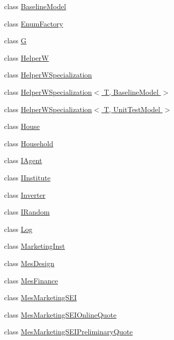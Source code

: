 \begin{DoxyCompactItemize}
\item 
class \hyperlink{classsolar__core_1_1_baseline_model}{Baseline\+Model}
\item 
class \hyperlink{classsolar__core_1_1_enum_factory}{Enum\+Factory}
\item 
class \hyperlink{classsolar__core_1_1_g}{G}
\item 
class \hyperlink{classsolar__core_1_1_helper_w}{Helper\+W}
\item 
class \hyperlink{classsolar__core_1_1_helper_w_specialization}{Helper\+W\+Specialization}
\item 
class \hyperlink{classsolar__core_1_1_helper_w_specialization_3_01_t_00_01_baseline_model_01_4}{Helper\+W\+Specialization$<$ T, Baseline\+Model $>$}
\item 
class \hyperlink{classsolar__core_1_1_helper_w_specialization_3_01_t_00_01_unit_test_model_01_4}{Helper\+W\+Specialization$<$ T, Unit\+Test\+Model $>$}
\item 
class \hyperlink{classsolar__core_1_1_house}{House}
\item 
class \hyperlink{classsolar__core_1_1_household}{Household}
\item 
class \hyperlink{classsolar__core_1_1_i_agent}{I\+Agent}
\item 
class \hyperlink{classsolar__core_1_1_i_institute}{I\+Institute}
\item 
class \hyperlink{classsolar__core_1_1_inverter}{Inverter}
\item 
class \hyperlink{classsolar__core_1_1_i_random}{I\+Random}
\item 
class \hyperlink{classsolar__core_1_1_log}{Log}
\item 
class \hyperlink{classsolar__core_1_1_marketing_inst}{Marketing\+Inst}
\item 
class \hyperlink{classsolar__core_1_1_mes_design}{Mes\+Design}
\item 
class \hyperlink{classsolar__core_1_1_mes_finance}{Mes\+Finance}
\item 
class \hyperlink{classsolar__core_1_1_mes_marketing_s_e_i}{Mes\+Marketing\+S\+E\+I}
\item 
class \hyperlink{classsolar__core_1_1_mes_marketing_s_e_i_online_quote}{Mes\+Marketing\+S\+E\+I\+Online\+Quote}
\item 
class \hyperlink{classsolar__core_1_1_mes_marketing_s_e_i_preliminary_quote}{Mes\+Marketing\+S\+E\+I\+Preliminary\+Quote}
\item 

\end{DoxyCompactItemize}
